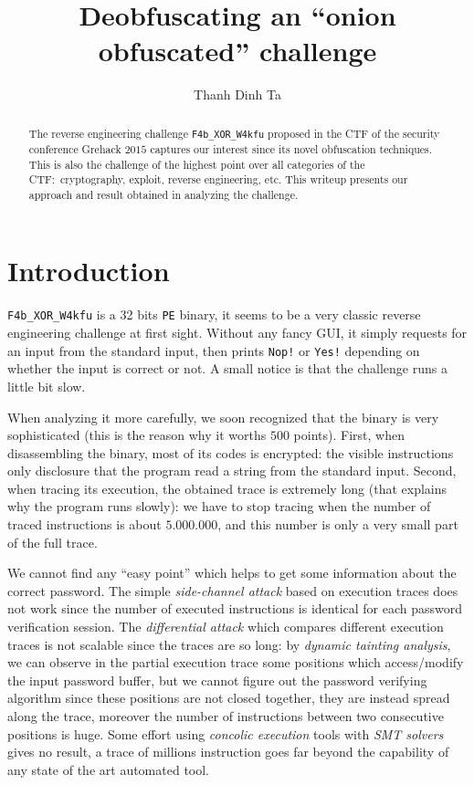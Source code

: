 \documentclass{easychair}
\begin{document}
\title{Deobfuscating an ``onion obfuscated'' challenge}

\author{
  Thanh Dinh Ta
}

\clearpage
\maketitle

\begin{abstract}
  The reverse engineering challenge \texttt{F4b\_XOR\_W4kfu} proposed in the CTF of the security conference Grehack $2015$ captures our interest since its novel obfuscation techniques. This is also the challenge of the highest point over all categories of the CTF:~cryptography, exploit, reverse engineering, etc. This writeup presents our approach and result obtained in analyzing the challenge.
\end{abstract}

\section{Introduction}
\label{sec:introduction}

\texttt{F4b\_XOR\_W4kfu} is a 32 bits \texttt{PE} binary, it seems to be a very classic reverse engineering challenge at first sight. Without any fancy GUI, it simply requests for an input from the standard input, then prints \texttt{Nop!} or \texttt{Yes!} depending on whether the input is correct or not. A small notice is that the challenge runs a little bit slow.

When analyzing it more carefully, we soon recognized that the binary is very sophisticated (this is the reason why it worths $500$ points). First, when disassembling the binary, most of its codes is encrypted: the visible instructions only disclosure that the program read a string from the standard input. Second, when tracing its execution, the obtained trace is extremely long (that explains why the program runs slowly): we have to stop tracing when the number of traced instructions is about $5.000.000$, and this number is only a very small part of the full trace.

We cannot find any ``easy point'' which helps to get some information about the correct password. The simple \emph{side-channel attack} based on execution traces does not work since the number of executed instructions is identical for each password verification session. The \emph{differential attack} which compares different execution traces is not scalable since the traces are so long: by \emph{dynamic tainting analysis}, we can observe in the partial execution trace some positions which access/modify the input password buffer, but we cannot figure out the password verifying algorithm since these positions are not closed together, they are instead spread along the trace, moreover the number of instructions between two consecutive positions is huge. Some effort using \emph{concolic execution} tools with \emph{SMT solvers} gives no result, a trace of millions instruction goes far beyond the capability of any state of the art automated tool.
\end{document}
